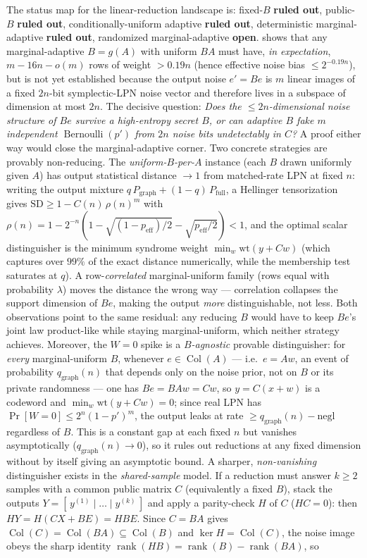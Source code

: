 \documentclass[11pt,a4paper]{article}
\theoremstyle{plain}
\theoremstyle{definition}
\begin{document}
\begin{enumerate}
The status map for the linear-reduction landscape is: fixed-$B$ \textbf{ruled out}, public-$B$ \textbf{ruled out}, conditionally-uniform adaptive \textbf{ruled out}, deterministic marginal-adaptive \textbf{ruled out}, randomized marginal-adaptive \textbf{open}.   shows that any marginal-adaptive $B=g(A)$ with uniform $BA$ must have, \emph{in expectation}, $m-16n-o(m)$ rows of weight $>0.19n$ (hence effective noise bias $\le 2^{-0.19n}$), but  is not yet established because the output noise $e'=Be$ is $m$ linear images of a fixed $2n$-bit symplectic-LPN noise vector and therefore lives in a subspace of dimension at most $2n$.  The decisive question: \emph{Does the $\le 2n$-dimensional noise structure of $Be$ survive a high-entropy secret $B$, or can adaptive $B$ fake $m$ independent $\operatorname{Bernoulli}(p')$ from $2n$ noise bits undetectably in $C$?}  A proof either way would close the marginal-adaptive corner. Two concrete strategies are provably non-reducing. The \emph{uniform-$B$-per-$A$} instance (each $B$ drawn uniformly given $A$) has output statistical distance $\to 1$ from matched-rate LPN at fixed $n$: writing the output mixture $q\,P_{\mathrm{graph}} + (1-q)\,P_{\mathrm{full}}$, a Hellinger tensorization gives $\mathrm{SD} \ge 1 - C(n)\,\rho(n)^m$ with $\rho(n) = 1 - 2^{-n}(1 - \sqrt{(1-p_{\mathrm{eff}})/2} - \sqrt{p_{\mathrm{eff}}/2}) < 1$, and the optimal scalar distinguisher is the minimum syndrome weight $\min_w \mathrm{wt}(y + Cw)$ (which captures over $99\%$ of the exact distance numerically, while the membership test saturates at $q$). A row-\emph{correlated} marginal-uniform family (rows equal with probability $\lambda$) moves the distance the wrong way --- correlation collapses the support dimension of $Be$, making the output \emph{more} distinguishable, not less. Both observations point to the same residual: any reducing $B$ would have to keep $Be$'s joint law product-like while staying marginal-uniform, which neither strategy achieves. Moreover, the $W=0$ spike is a \emph{$B$-agnostic} provable distinguisher: for \emph{every} marginal-uniform $B$, whenever $e \in \operatorname{Col}(A)$ --- i.e.\ $e = Aw$, an event of probability $q_{\mathrm{graph}}(n)$ that depends only on the noise prior, not on $B$ or its private randomness --- one has $Be = BAw = Cw$, so $y = C(x+w)$ is a codeword and $\min_w \mathrm{wt}(y+Cw) = 0$; since real LPN has $\Pr[W=0] \le 2^n(1-p')^m$, the output leaks at rate $\ge q_{\mathrm{graph}}(n) - \mathrm{negl}$ regardless of $B$. This is a constant gap at each fixed $n$ but vanishes asymptotically ($q_{\mathrm{graph}}(n) \to 0$), so it rules out reductions at any fixed dimension without by itself giving an asymptotic bound. A sharper, \emph{non-vanishing} distinguisher exists in the \emph{shared-sample} model. If a reduction must answer $k\ge 2$ samples with a common public matrix $C$ (equivalently a fixed $B$), stack the outputs $Y = [\,y^{(1)} \mid \dots \mid y^{(k)}\,]$ and apply a parity-check $H$ of $C$ ($HC=0$): then $HY = H(CX + BE) = HBE$. Since $C=BA$ gives $\operatorname{Col}(C)=\operatorname{Col}(BA)\subseteq\operatorname{Col}(B)$ and $\ker H=\operatorname{Col}(C)$, the noise image obeys the sharp identity $\operatorname{rank}(HB)=\operatorname{rank}(B)-\operatorname{rank}(BA)$, so

\end{enumerate}
\end{document}
